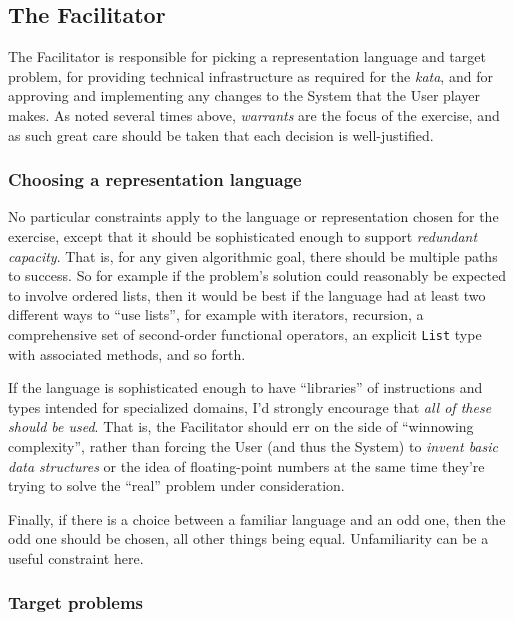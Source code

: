 \subsection{The Facilitator}\hypertarget{the-facilitator}{}\label{the-facilitator}

The Facilitator is responsible for picking a representation language and target problem, for providing  technical infrastructure as required for the \emph{kata}, and for approving and implementing any changes to the System that the User player makes. As noted several times above, \emph{warrants} are the focus of the exercise, and as such great care should be taken that each decision is well-justified.

\subsubsection{Choosing a representation language}\hypertarget{choosing-a-representation-language}{}\label{choosing-a-representation-language}

No particular constraints apply to the language or representation chosen for the exercise, except that it should be sophisticated enough to support \emph{redundant capacity}. That is, for any given algorithmic goal, there should be multiple paths to success.  So for example if the problem's solution could reasonably be expected to involve ordered lists, then it would be best if the language had at least two different ways to ``use lists'', for example with iterators, recursion, a comprehensive set of second-order functional operators, an explicit \texttt{List} type with associated methods, and so forth.

If the language is sophisticated enough to have ``libraries'' of instructions and types intended for specialized domains, I'd strongly encourage that \emph{all of these should be used}. That is, the Facilitator should err on the side of ``winnowing complexity'', rather than forcing the User (and thus the System) to \emph{invent basic data structures} or the idea of floating-point numbers at the same time they're trying to solve the ``real'' problem under consideration.

Finally, if there is a choice between a familiar language and an odd one, then the odd one should be chosen, all other things being equal. Unfamiliarity can be a useful constraint here.

\subsubsection{Target problems}\hypertarget{target-problems}{}\label{target-problems}

